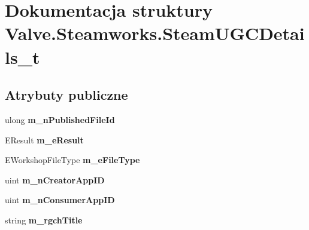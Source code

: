 \hypertarget{struct_valve_1_1_steamworks_1_1_steam_u_g_c_details__t}{}\section{Dokumentacja struktury Valve.\+Steamworks.\+Steam\+U\+G\+C\+Details\+\_\+t}
\label{struct_valve_1_1_steamworks_1_1_steam_u_g_c_details__t}
\subsection*{Atrybuty publiczne}
\begin{DoxyCompactItemize}
\item 
\mbox{\label{struct_valve_1_1_steamworks_1_1_steam_u_g_c_details__t_ae06d6b0f7e452c13ec5d5fff5670f924}} 
ulong {\bfseries m\+\_\+n\+Published\+File\+Id}
\item 
\mbox{\label{struct_valve_1_1_steamworks_1_1_steam_u_g_c_details__t_aea9e18e3f6db0baa714874d42967eafd}} 
E\+Result {\bfseries m\+\_\+e\+Result}
\item 
\mbox{\label{struct_valve_1_1_steamworks_1_1_steam_u_g_c_details__t_abf37115437c62387feeb9be6a1224e37}} 
E\+Workshop\+File\+Type {\bfseries m\+\_\+e\+File\+Type}
\item 
\mbox{\label{struct_valve_1_1_steamworks_1_1_steam_u_g_c_details__t_a2644c2e7d41903d2be0803718025f7ed}} 
uint {\bfseries m\+\_\+n\+Creator\+App\+ID}
\item 
\mbox{\label{struct_valve_1_1_steamworks_1_1_steam_u_g_c_details__t_a5419f84b359f2bed8fa54624628776c8}} 
uint {\bfseries m\+\_\+n\+Consumer\+App\+ID}
\item 
\mbox{\label{struct_valve_1_1_steamworks_1_1_steam_u_g_c_details__t_ae37a8e33463d0cc9960ebf6202c3975b}} 
string {\bfseries m\+\_\+rgch\+Title}
\item 
\mbox{\label{struct_valve_1_1_steamworks_1_1_steam_u_g_c_details__t_a956facdc9d6aafd4d9f6aa5420683199}} 

\end{DoxyCompactItemize}
